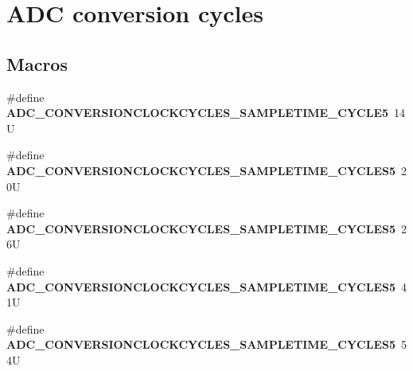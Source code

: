 \hypertarget{group___a_d_c__conversion__cycles}{}\section{A\+DC conversion cycles}
\label{group___a_d_c__conversion__cycles}
\subsection*{Macros}
\begin{DoxyCompactItemize}
\item 
\mbox{\label{group___a_d_c__conversion__cycles_ga7ebea47f239b6c4adcd21c1a3f37924b}} 
\#define {\bfseries A\+D\+C\+\_\+\+C\+O\+N\+V\+E\+R\+S\+I\+O\+N\+C\+L\+O\+C\+K\+C\+Y\+C\+L\+E\+S\+\_\+\+S\+A\+M\+P\+L\+E\+T\+I\+M\+E\+\_\+C\+Y\+C\+L\+E5}~14U
\item 
\mbox{\label{group___a_d_c__conversion__cycles_gaaf1d507fa306119181bf974555e07d05}} 
\#define {\bfseries A\+D\+C\+\_\+\+C\+O\+N\+V\+E\+R\+S\+I\+O\+N\+C\+L\+O\+C\+K\+C\+Y\+C\+L\+E\+S\+\_\+\+S\+A\+M\+P\+L\+E\+T\+I\+M\+E\+\_\+C\+Y\+C\+L\+E\+S5}~20U
\item 
\mbox{\label{group___a_d_c__conversion__cycles_ga16659d5def5b956b4ebe3d121f542a50}} 
\#define {\bfseries A\+D\+C\+\_\+\+C\+O\+N\+V\+E\+R\+S\+I\+O\+N\+C\+L\+O\+C\+K\+C\+Y\+C\+L\+E\+S\+\_\+\+S\+A\+M\+P\+L\+E\+T\+I\+M\+E\+\_\+C\+Y\+C\+L\+E\+S5}~26U
\item 
\mbox{\label{group___a_d_c__conversion__cycles_ga1b56cd115eada8fddc7be2536d48e26a}} 
\#define {\bfseries A\+D\+C\+\_\+\+C\+O\+N\+V\+E\+R\+S\+I\+O\+N\+C\+L\+O\+C\+K\+C\+Y\+C\+L\+E\+S\+\_\+\+S\+A\+M\+P\+L\+E\+T\+I\+M\+E\+\_\+C\+Y\+C\+L\+E\+S5}~41U
\item 
\mbox{\label{group___a_d_c__conversion__cycles_ga4fe23644b043f6da3c29c2bd64b70a72}} 
\#define {\bfseries A\+D\+C\+\_\+\+C\+O\+N\+V\+E\+R\+S\+I\+O\+N\+C\+L\+O\+C\+K\+C\+Y\+C\+L\+E\+S\+\_\+\+S\+A\+M\+P\+L\+E\+T\+I\+M\+E\+\_\+C\+Y\+C\+L\+E\+S5}~54U
\item 
\mbox{\label{group___a_d_c__conversion__cycles_gaaa7f37416a33b8c5b748a6714101d44d}} 

\end{DoxyCompactItemize}
